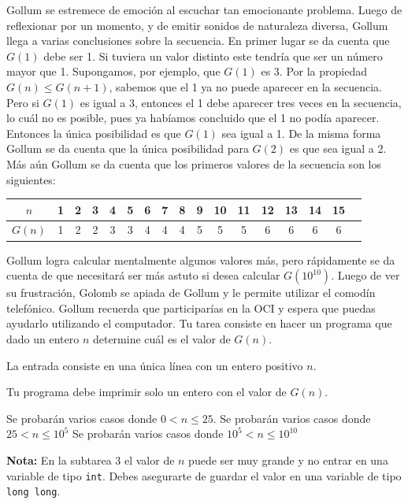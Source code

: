 \documentclass{oci}
\begin{document}
\begin{problemDescription}
Gollum se estremece de emoción al escuchar tan emocionante problema.
Luego de reflexionar por un momento, y de emitir sonidos de naturaleza diversa, Gollum llega a varias conclusiones sobre la secuencia.
En primer lugar se da cuenta que $G(1)$ debe ser 1. 
Si tuviera un valor distinto este tendría que ser un número mayor que 1.
Supongamos, por ejemplo, que $G(1)$ es 3.
Por la propiedad $G(n)\leq G(n+1)$, sabemos que el 1 ya no puede aparecer en la secuencia.
Pero si $G(1)$ es igual a 3, entonces el 1 debe aparecer tres veces en la secuencia, lo cuál no es posible, pues ya habíamos concluido que el 1 no podía aparecer.
Entonces la única posibilidad es que $G(1)$ sea igual a 1.
De la misma forma Gollum se da cuenta que la única posibilidad para $G(2)$ es que sea igual a 2.
Más aún Gollum se da cuenta que los primeros valores de la secuencia son los siguientes:
\begin{center}
  \begin{tabular}{c|cccccccccccccccc}
	$n$ & 1 & 2 & 3 & 4 & 5 & 6 & 7 & 8 & 9 & 10 & 11 & 12 & 13 & 14 & 15 \\
  \hline
	$G(n)$ & 1 & 2 & 2 & 3 & 3 & 4 & 4 & 4 & 5 & 5 & 5 & 6 & 6 & 6 & 6 
  \end{tabular}
\end{center}
Gollum logra calcular mentalmente algunos valores más, pero rápidamente se da cuenta de que necesitará ser más astuto si desea calcular $G(10^{10})$.
Luego de ver su frustración, Golomb se apiada de Gollum y le permite utilizar el comodín telefónico.
Gollum recuerda que participarías en la OCI y espera que puedas ayudarlo utilizando el computador.
Tu tarea consiste en hacer un programa que dado un entero $n$ determine cuál es el valor de $G(n)$.
\end{problemDescription}

\begin{inputDescription}
  La entrada consiste en una única línea con un entero positivo $n$.
\end{inputDescription}

\begin{outputDescription}
  Tu programa debe imprimir solo un entero con el valor de $G(n)$.
\end{outputDescription}

\begin{scoreDescription}
   Se probarán varios casos donde $0 < n \leq 25$.
   Se probarán varios casos donde $25 < n \leq 10^5$
   Se probarán varios casos donde $10^5 < n \leq 10^{10}$
\end{scoreDescription}
\textbf{Nota:} En la subtarea 3 el valor de $n$ puede ser muy grande y no entrar en una variable de tipo \texttt{int}. Debes asegurarte de guardar el valor en una variable de tipo \texttt{long long}.

\begin{sampleDescription}
\end{sampleDescription}
\end{document}
